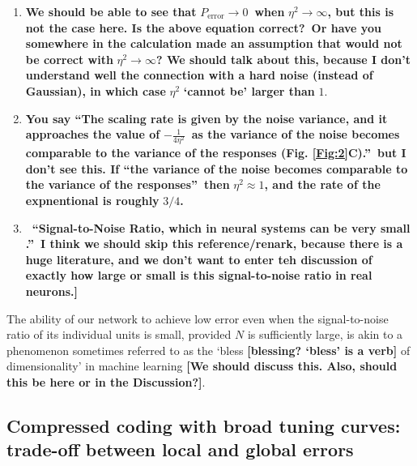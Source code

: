 \documentclass[a4paper]{article}%
\begin{document}
\begin{enumerate}
\item \textbf{We should be able to see that }$P_{\text{error}}\rightarrow
0$\textbf{\ when }$\eta^{2}\rightarrow\infty$\textbf{, but this is not the
case here. Is the above equation correct?\ Or have you somewhere in the
calculation made an assumption that would not be correct with }$\eta
^{2}\rightarrow\infty$\textbf{? We should talk about this, because I don't
understand well the connection with a hard noise (instead of Gaussian), in
which case }$\eta^{2}$ \textbf{`cannot be' larger than} $1$.

\item \textbf{You say \textquotedblleft The scaling rate is given by the noise
variance, and it approaches the value of }$-\frac{1}{4\eta^{2}}$\textbf{\ as
the variance of the noise becomes comparable to the variance of the responses
(Fig. \ref{Fig:2}C).\textquotedblright\ but I don't see this. If
\textquotedblleft the variance of the noise becomes comparable to the variance
of the responses\textquotedblright\ then }$\eta^{2}\approx1$\textbf{, and the
rate of the expnentional is roughly }$3/4$\textbf{.}

\item \textbf{\ \textquotedblleft Signal-to-Noise Ratio, which in neural
systems can be very small \cite{Softky1993TheEPSPs}.\textquotedblright\ I
think we should skip this reference/renark, because there is a huge
literature, and we don't want to enter teh discussion of exactly how large or
small is this signal-to-noise ratio in real neurons.]}
\end{enumerate}

The ability of our network to achieve low error even when the signal-to-noise
ratio of its individual units is small, provided $N$ is sufficiently large, is
akin to a phenomenon sometimes referred to as the `bless \textbf{[blessing?
`bless' is a verb]} of dimensionality' in machine learning
\cite{Donoho2000High-dimensionalDimensionality} \textbf{[We should discuss
this. Also, should this be here or in the Discussion?]}.

\subsection{Compressed coding with broad tuning curves: trade-off between
local and global errors}
\end{document}
